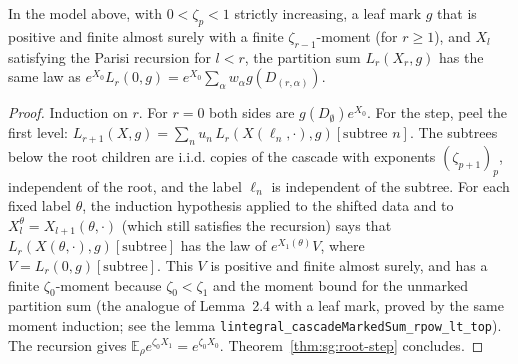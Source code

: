 \begin{theorem}\label{thm:sg:parisi-law}
  \leanok
In the model above, with $0<\zeta_p<1$ strictly increasing, a leaf mark $g$ that is positive and finite
almost surely with a finite $\zeta_{r-1}$-moment (for $r\ge1$), and $X_l$ satisfying the Parisi
recursion for $l<r$, the partition sum $L_r(X_r,g)$ has the same law as
$e^{X_0}L_r(0,g)=e^{X_0}\sum_\alpha w_\alpha g(D_{(r,\alpha)})$.
\end{theorem}
\begin{proof}
  \leanok
Induction on $r$. For $r=0$ both sides are $g(D_\emptyset)e^{X_0}$. For the step, peel the first
level: $L_{r+1}(X,g)=\sum_nu_n\,L_r(X(\ell_n,\cdot),g)[\text{subtree }n]$. The subtrees below the root children are
i.i.d. copies of the cascade with exponents $(\zeta_{p+1})_p$, independent of the root, and
the label $\ell_n$ is independent of the subtree. For each fixed label $\theta$, the induction
hypothesis applied to the shifted data and to $X_l^\theta=X_{l+1}(\theta,\cdot)$ (which still satisfies the
recursion) says that $L_r(X(\theta,\cdot),g)[\text{subtree}]$ has the law of $e^{X_1(\theta)}V$, where
$V=L_r(0,g)[\text{subtree}]$. This $V$ is positive and finite almost surely, and has a finite
$\zeta_0$-moment because $\zeta_0<\zeta_1$ and the moment bound for the unmarked partition sum
(the analogue of Lemma~2.4 with a leaf mark, proved by the same moment induction; see the lemma
\texttt{lintegral\_cascadeMarkedSum\_rpow\_lt\_top}). The recursion gives $\mathbb E_\rho e^{\zeta_0X_1}=e^{\zeta_0X_0}$.
Theorem~\ref{thm:sg:root-step} concludes.
\end{proof}

